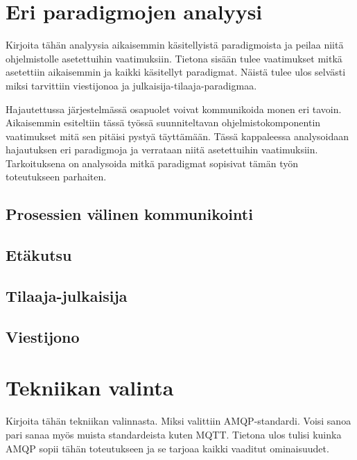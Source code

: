 

\section{Eri paradigmojen analyysi}
\begin{it}
	Kirjoita tähän analyysia aikaisemmin käsitellyistä paradigmoista ja peilaa niitä ohjelmistolle asetettuihin vaatimuksiin. Tietona sisään tulee vaatimukset mitkä asetettiin aikaisemmin ja kaikki käsitellyt paradigmat. Näistä tulee ulos selvästi miksi tarvittiin viestijonoa ja julkaisija-tilaaja-paradigmaa.
\end{it}
Hajautettussa järjestelmässä osapuolet voivat kommunikoida monen eri tavoin. Aikaisemmin esiteltiin tässä työssä suunniteltavan ohjelmistokomponentin vaatimukset mitä sen pitäisi pystyä täyttämään. Tässä kappaleessa analysoidaan hajautuksen eri paradigmoja ja verrataan niitä asetettuihin vaatimuksiin. Tarkoituksena on analysoida mitkä paradigmat sopisivat tämän työn toteutukseen parhaiten.




\subsection{Prosessien välinen kommunikointi}


\subsection{Etäkutsu}


\subsection{Tilaaja-julkaisija}


\subsection{Viestijono}


\section{Tekniikan valinta}
\begin{it}
	Kirjoita tähän tekniikan valinnasta. Miksi valittiin AMQP-standardi. Voisi sanoa pari sanaa myös muista standardeista kuten MQTT. Tietona ulos tulisi kuinka AMQP sopii tähän toteutukseen ja se tarjoaa kaikki vaaditut ominaisuudet.
\end{it}


